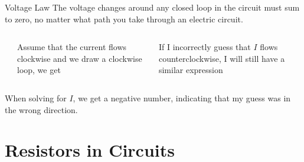 \documentclass[12pt,aspectratio=169]{beamer}
\newcommand{\eq}[2]{\vspace{#1}{\Large\begin{displaymath}#2\end{displaymath}}}
\begin{document}
\begin{frame}{Voltage Law}
  The voltage changes around any closed loop in the circuit must sum to zero,
  no matter what path you take through an electric circuit.

  \vspace{.1in}
  \begin{columns}
    \begin{center}
    \end{center}
    Assume that the current flows clockwise and we draw a clockwise loop, we
    get

    \eq{-.2in}{ V-V_R=0\;\;\rightarrow\;\; V-IR=0}

    \vspace{-.25in}If I incorrectly guess that $I$ flows counterclockwise, I
    will still have a similar expression

    \eq{-.25in}{-V_R-V=0\;\;\rightarrow\;\; -V-IR=0}
  \end{columns}

  \vspace{-.1in}When solving for $I$, we get a negative number, indicating
  that my guess was in the wrong direction.
\end{frame}



\section{Resistors in Circuits}
\end{document}
